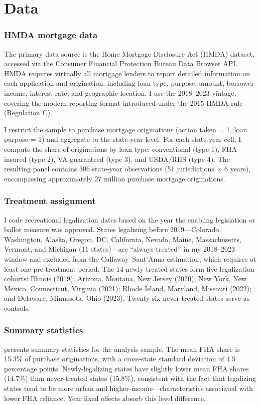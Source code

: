 \documentclass[12pt]{article}
\begin{document}
\section{Data}
\label{sec:data}

\subsubsection*{HMDA mortgage data} The primary data source is the Home Mortgage Disclosure Act (HMDA) dataset, accessed via the Consumer Financial Protection Bureau Data Browser API. HMDA requires virtually all mortgage lenders to report detailed information on each application and origination, including loan type, purpose, amount, borrower income, interest rate, and geographic location. I use the 2018--2023 vintage, covering the modern reporting format introduced under the 2015 HMDA rule (Regulation C).

I restrict the sample to purchase mortgage originations (action taken = 1, loan purpose = 1) and aggregate to the state-year level. For each state-year cell, I compute the share of originations by loan type: conventional (type 1), FHA-insured (type 2), VA-guaranteed (type 3), and USDA/RHS (type 4). The resulting panel contains 306 state-year observations (51 jurisdictions $\times$ 6 years), encompassing approximately 27 million purchase mortgage originations.

\subsubsection*{Treatment assignment} I code recreational legalization dates based on the year the enabling legislation or ballot measure was approved. States legalizing before 2019---Colorado, Washington, Alaska, Oregon, DC, California, Nevada, Maine, Massachusetts, Vermont, and Michigan (11 states)---are ``always-treated'' in my 2018--2023 window and excluded from the Callaway--Sant'Anna estimation, which requires at least one pre-treatment period. The 14 newly-treated states form five legalization cohorts: Illinois (2019); Arizona, Montana, New Jersey (2020); New York, New Mexico, Connecticut, Virginia (2021); Rhode Island, Maryland, Missouri (2022); and Delaware, Minnesota, Ohio (2023). Twenty-six never-treated states serve as controls.

\subsubsection*{Summary statistics}  presents summary statistics for the analysis sample. The mean FHA share is 15.3\% of purchase originations, with a cross-state standard deviation of 4.5 percentage points. Newly-legalizing states have slightly lower mean FHA shares (14.7\%) than never-treated states (15.8\%), consistent with the fact that legalizing states tend to be more urban and higher-income---characteristics associated with lower FHA reliance. Year fixed effects absorb this level difference.
\end{document}
